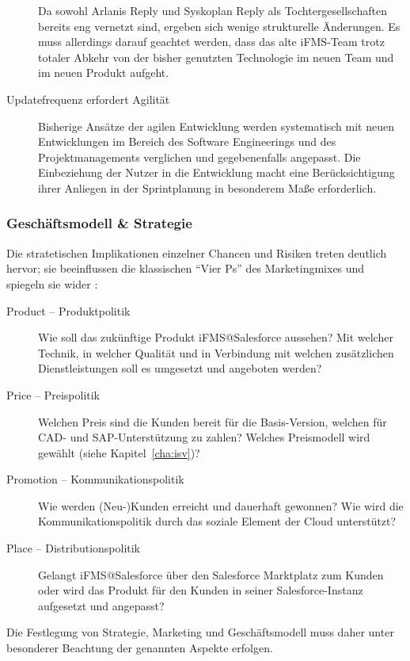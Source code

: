 \begin{description}
Da sowohl Arlanis Reply und Syskoplan Reply als Tochtergesellschaften bereits 
eng vernetzt sind, ergeben sich wenige strukturelle Änderungen. Es muss 
allerdings darauf geachtet werden, dass das alte iFMS-Team trotz totaler Abkehr 
von der bisher genutzten Technologie im neuen Team und im neuen Produkt 
aufgeht.
	\item[Updatefrequenz erfordert Agilität] Bisherige Ansätze der agilen 
Entwicklung werden systematisch mit neuen Entwicklungen im Bereich des Software 
Engineerings und des Projektmanagements verglichen und gegebenenfalls 
angepasst. Die Einbeziehung der Nutzer in die Entwicklung macht eine 
Berücksichtigung ihrer Anliegen in der Sprintplanung in besonderem Maße 
erforderlich.
\end{description}

\subsubsection{Geschäftsmodell \& Strategie}
Die stratetischen Implikationen einzelner Chancen und Risiken treten deutlich 
hervor; sie beeinflussen die klassischen "`Vier Ps"' des Marketingmixes und 
spiegeln sie wider :
\begin{description}
	\item[Product -- Produktpolitik] Wie soll das 
zukünftige Produkt iFMS@Salesforce aussehen? Mit welcher Technik, in welcher 
Qualität und in Verbindung mit welchen zusätzlichen Dienstleistungen soll es 
umgesetzt und angeboten werden?
	\item[Price -- Preispolitik] Welchen Preis sind die 
Kunden bereit für die Basis-Version, welchen für CAD- und SAP-Unterstützung zu zahlen? 
Welches Preismodell wird gewählt (siehe Kapitel~\ref{cha:isv})? 
	\item[Promotion -- Kommunikationspolitik] Wie werden (Neu-)Kunden 
erreicht und dauerhaft gewonnen? Wie wird die Kommunikationspolitik durch das 
soziale Element der Cloud unterstützt?
	\item[Place --  Distributionspolitik] Gelangt iFMS@Salesforce über den 
Salesforce Marktplatz zum Kunden oder wird das Produkt für den Kunden in seiner 
Salesforce-Instanz aufgesetzt und angepasst?
\end{description}
Die Festlegung von Strategie, Marketing und Geschäftsmodell muss daher unter 
besonderer Beachtung der genannten Aspekte erfolgen. 

